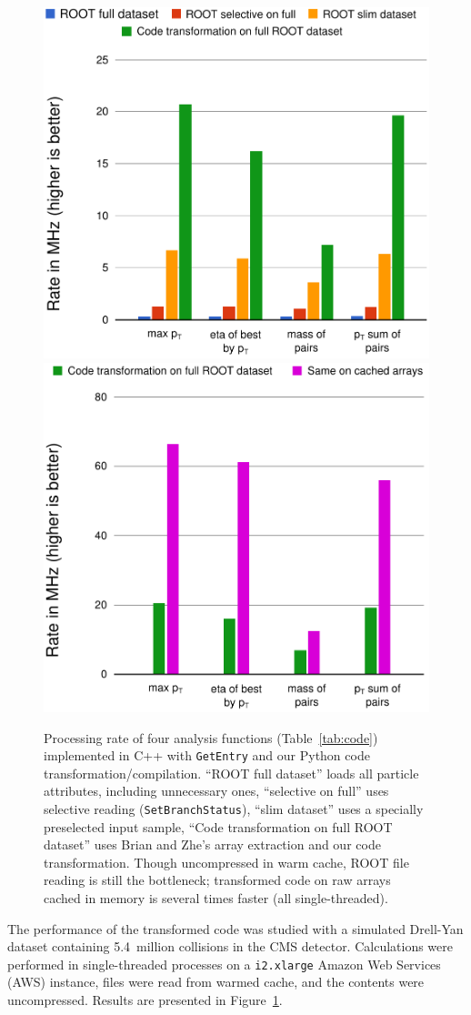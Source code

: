 \documentclass[a4paper]{jpconf}
\begin{document}
\begin{figure}
\includegraphics[width=0.47\linewidth]{root-and-plur.pdf} \hfill
\includegraphics[width=0.47\linewidth]{physical-media.pdf}

\caption{\label{fig:codetrans} Processing rate of four analysis functions (Table~\ref{tab:code}) implemented in C++ with {\tt GetEntry} and our Python code transformation/compilation. ``ROOT full dataset'' loads all particle attributes, including unnecessary ones, ``selective on full'' uses selective reading ({\tt SetBranchStatus}), ``slim dataset'' uses a specially preselected input sample, ``Code transformation on full ROOT dataset'' uses Brian and Zhe's array extraction and our code transformation. Though uncompressed in warm cache, ROOT file reading is still the bottleneck; transformed code on raw arrays cached in memory is several times faster (all single-threaded).}
\end{figure}

The performance of the transformed code was studied with a simulated Drell-Yan dataset containing 5.4~million collisions in the CMS detector. Calculations were performed in single-threaded processes on a {\tt i2.xlarge} Amazon Web Services (AWS) instance, files were read from warmed cache, and the contents were uncompressed. Results are presented in Figure~\ref{fig:codetrans}. 
\end{document}
